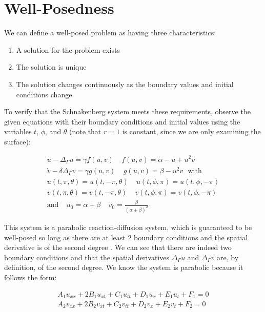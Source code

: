 \documentclass[12pt]{article}
\begin{document}
\section{Well-Posedness}

We can define a well-posed problem as having three characteristics:

\begin{enumerate}
	\item A solution for the problem exists
	\item The solution is unique
	\item The solution changes continuously as the boundary values and initial conditions change.
\end{enumerate}

To verify that the Schnakenberg system meets these requirements, observe the given equations with their boundary conditions and initial values using the variables $t$, $\phi$, and $\theta$ (note that $r=1$ is constant, since we are only examining the surface):

\begin{equation}
	\begin{aligned}
		\dot{u} - \Delta_\Gamma u = \gamma f(u,v) ~~~~~ f(u,v) = \alpha - u + u^2v ~~~\\
		\dot{v} - \delta\Delta_\Gamma v = \gamma g(u, v) ~~~~~ g(u, v) = \beta - u^2v ~~~ \text{with}\\
		u(t,\pi, \theta) = u(t, -\pi, \theta) ~~~~~ u(t, \phi, \pi) = u(t, \phi, -\pi) \\
		v(t,\pi, \theta) = v(t, -\pi, \theta) ~~~~~ v(t, \phi, \pi) = v(t, \phi, -\pi)	\\
		\text{and} ~~~~~ u_0 = \alpha + \beta ~~~~~ v_0 = \frac{\beta}{(\alpha+\beta)^2}~~~~~~
	\end{aligned}
\end{equation}

This system is a parabolic reaction-diffusion system, which is guaranteed to be well-posed so long as there are at least 2 boundary conditions and the spatial derivative is of the second degree \cite{Tas2007}. We can see that there are indeed two boundary conditions and that the spatial derivatives $\Delta_\Gamma u$ and $\Delta_\Gamma v$ are, by definition, of the second degree. We know the system is parabolic because it follows the form:

\begin{equation}
	\begin{aligned}
		A_1u_{xx} + 2B_1u_{xt} + C_1u_{tt} + D_1u_x + E_1u_t + F_1 = 0 \\
		A_2v_{xx} + 2B_2v_{xt} + C_2v_{tt} + D_2v_x + E_2v_t + F_2 = 0
	\end{aligned}
\end{equation}
\end{document}
